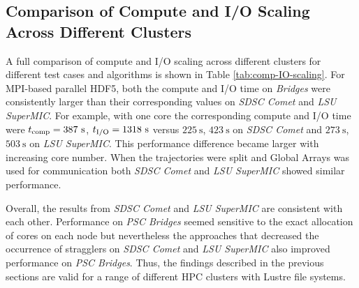 \subsection{Comparison of Compute and I/O Scaling Across Different Clusters}
A full comparison of compute and I/O scaling across different clusters for different test cases and algorithms is shown in Table \ref{tab:comp-IO-scaling}. 
For MPI-based parallel HDF5, both the compute and I/O time on \emph{Bridges} were consistently larger than their corresponding values on \emph{SDSC Comet} and \emph{LSU SuperMIC}.
For example, with one core the corresponding compute and I/O time were ${t}_{\text{comp}} = 387~\text{s}$, ${t}_{\text{I/O}} = 1318~\text{s}$ versus $225~\text{s}$, $423~\text{s}$ on \emph{SDSC Comet} and $273~\text{s}$, $503~\text{s}$ on \emph{LSU SuperMIC}.
This performance difference became larger with increasing core number.
When the trajectories were split and Global Arrays was used for communication both \emph{SDSC Comet} and \emph{LSU SuperMIC} showed similar performance.

Overall, the results from \emph{SDSC Comet} and \emph{LSU SuperMIC} are consistent with each other.
Performance on \emph{PSC Bridges} seemed sensitive to the exact allocation of cores on each node but nevertheless the approaches that decreased the occurrence of stragglers on \emph{SDSC Comet} and \emph{LSU SuperMIC} also improved performance on \emph{PSC Bridges}.
Thus, the findings described in the previous sections are valid for a range of different HPC clusters with Lustre file systems.

